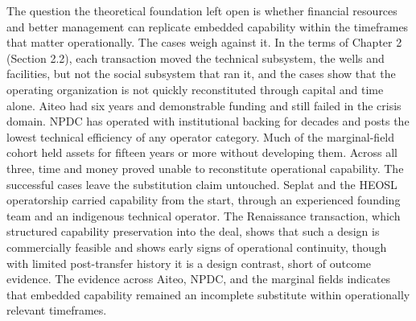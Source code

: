 The question the theoretical foundation left open is whether financial
resources and better management can replicate embedded capability within
the timeframes that matter operationally. The cases weigh against it. In
the terms of Chapter 2 (Section 2.2), each transaction moved the
technical subsystem, the wells and facilities, but not the social
subsystem that ran it, and the cases show that the operating
organization is not quickly reconstituted through capital and time
alone. Aiteo had six years and demonstrable funding and still failed in
the crisis domain. NPDC has operated with institutional backing for
decades and posts the lowest technical efficiency of any operator
category. Much of the marginal-field cohort held assets for fifteen
years or more without developing them. Across all three, time and money
proved unable to reconstitute operational capability. The successful
cases leave the substitution claim untouched. Seplat and the HEOSL
operatorship carried capability from the start, through an experienced
founding team and an indigenous technical operator. The Renaissance
transaction, which structured capability preservation into the deal,
shows that such a design is commercially feasible and shows early signs
of operational continuity, though with limited post-transfer history it
is a design contrast, short of outcome evidence. The evidence across
Aiteo, NPDC, and the marginal fields indicates that embedded capability
remained an incomplete substitute within operationally relevant
timeframes.

